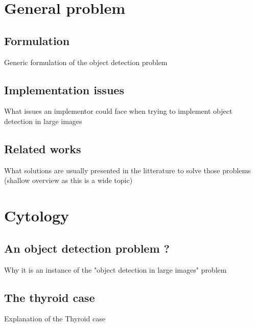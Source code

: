 \section{General problem}
\subsection{Formulation}
Generic formulation of the object detection problem
\subsection{Implementation issues}
What issues an implementor could face when trying to implement object detection in large images
\subsection{Related works}
What solutions are usually presented in the litterature to solve those problems (shallow overview as this is a wide topic) 
\section{Cytology}
\subsection{An object detection problem ?}
Why it is an instance of the "object detection in large images" problem
\subsection{The thyroid case}
Explanation of the Thyroid case 